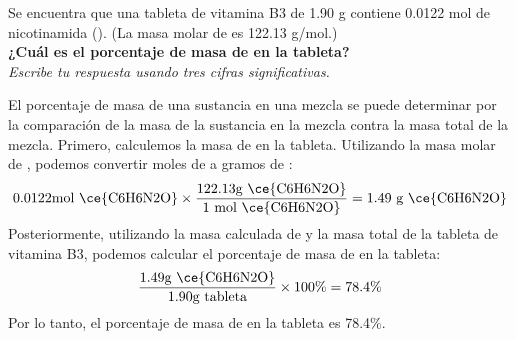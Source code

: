 Se encuentra que una tableta de vitamina B3 de 1.90 g contiene 0.0122 mol de nicotinamida (). (La masa molar de  es 122.13 g/mol.)\\
\textbf{¿Cuál es el porcentaje de masa de  en la tableta?}\\
\emph{Escribe tu respuesta usando tres cifras significativas.}

\begin{solutionbox}{6cm}
    El porcentaje de masa de una sustancia en una mezcla se puede determinar por la comparación de la masa de la sustancia en la mezcla contra la masa total de la mezcla.
    Primero, calculemos la masa de  en la tableta. Utilizando la masa molar de , podemos convertir moles de  a gramos de :
    \[ 0.0122 \text{mol \ce{C6H6N2O}} \times \frac{122.13 \text{g \ce{C6H6N2O}}}{1\ \text{mol \ce{C6H6N2O}}} = 1.49\ \text{g \ce{C6H6N2O}} \]
    Posteriormente, utilizando la masa calculada de  y la masa total de la tableta de vitamina B3, podemos calcular el porcentaje de masa de  en la tableta:
\[ \frac{1.49 \text{g \ce{C6H6N2O}}}{1.90 \text{g tableta}} \times 100\% = 78.4\% \]
    Por lo tanto, el porcentaje de masa de  en la tableta es 78.4\%.
\end{solutionbox}